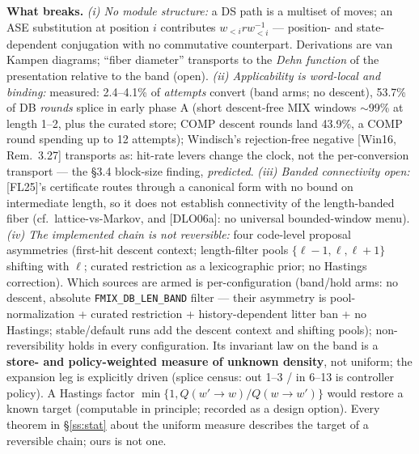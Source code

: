 \documentclass[11pt]{article}
\newcommand{\code}[1]{\texttt{#1}}
\begin{document}
\textbf{What breaks.} \emph{(i) No module structure:} a DS path is a multiset of moves; an ASE
substitution at position $i$ contributes $w_{<i}rw_{<i}^{-1}$ --- position- and state-dependent
conjugation with no commutative counterpart. Derivations are van Kampen diagrams; ``fiber diameter''
transports to the \emph{Dehn function} of the presentation relative to the band (open).
\emph{(ii) Applicability is word-local and binding:} measured: 2.4--4.1\% of \emph{attempts}
convert (band arms; no descent), 53.7\% of DB \emph{rounds} splice in early phase A (short
descent-free MIX windows $\sim$99\% at length 1--2, plus the curated store; COMP descent rounds land
43.9\%, a COMP round spending up to 12 attempts); Windisch's rejection-free negative
[Win16, Rem.~3.27] transports as: hit-rate levers change the clock, not the per-conversion transport --- the \S3.4
block-size finding, \emph{predicted}. \emph{(iii) Banded connectivity open:} [FL25]'s certificate
routes through a canonical form with no bound on intermediate length, so it does not establish
connectivity of the length-banded fiber (cf.\ lattice-vs-Markov, and [DLO06a]: no universal
bounded-window menu). \emph{(iv) The implemented chain is not reversible:} four code-level proposal
asymmetries (first-hit descent context; length-filter pools $\{\ell-1,\ell,\ell+1\}$ shifting with
$\ell$; curated restriction as a lexicographic prior; no Hastings correction). Which sources are armed is
per-configuration (band/hold arms: no descent, absolute \code{FMIX\_DB\_LEN\_BAND} filter --- their
asymmetry is pool-normalization + curated restriction + history-dependent litter ban + no Hastings;
stable/default runs add the descent context and shifting pools); non-reversibility holds in every
configuration. Its invariant law on
the band is a \textbf{store- and policy-weighted measure of unknown density}, not uniform; the
expansion leg is explicitly driven (splice census: out 1--3 / in 6--13 is controller policy). A
Hastings factor $\min\{1, Q(w'\to w)/Q(w\to w')\}$ would restore a known target (computable in
principle; recorded as a design option). Every theorem in \S\ref{ss:stat} about the uniform measure
describes the target of a reversible chain; ours is not one.
\end{document}
